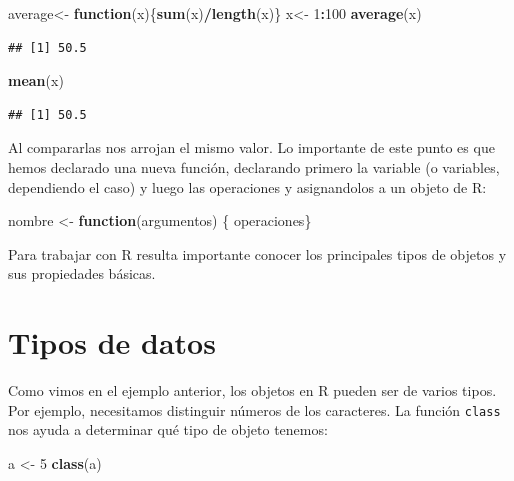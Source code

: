 \documentclass[
]{book}
\newenvironment{Shaded}{\begin{snugshade}}{\end{snugshade}}
\newcommand{\ControlFlowTok}[1]{\textcolor[rgb]{0.13,0.29,0.53}{\textbf{#1}}}
\newcommand{\DecValTok}[1]{\textcolor[rgb]{0.00,0.00,0.81}{#1}}
\newcommand{\FunctionTok}[1]{\textcolor[rgb]{0.13,0.29,0.53}{\textbf{#1}}}
\newcommand{\NormalTok}[1]{#1}
\newcommand{\OtherTok}[1]{\textcolor[rgb]{0.56,0.35,0.01}{#1}}
\newcommand{\SpecialCharTok}[1]{\textcolor[rgb]{0.81,0.36,0.00}{\textbf{#1}}}
\begin{document}
\begin{Shaded}
\begin{Highlighting}[]
\NormalTok{average}\OtherTok{\textless{}{-}} \ControlFlowTok{function}\NormalTok{(x)\{}\FunctionTok{sum}\NormalTok{(x)}\SpecialCharTok{/}\FunctionTok{length}\NormalTok{(x)\}}
\NormalTok{x}\OtherTok{\textless{}{-}} \DecValTok{1}\SpecialCharTok{:}\DecValTok{100}
\FunctionTok{average}\NormalTok{(x)}
\end{Highlighting}
\end{Shaded}

\begin{verbatim}
## [1] 50.5
\end{verbatim}

\begin{Shaded}
\begin{Highlighting}[]
\FunctionTok{mean}\NormalTok{(x)}
\end{Highlighting}
\end{Shaded}

\begin{verbatim}
## [1] 50.5
\end{verbatim}

Al compararlas nos arrojan el mismo valor.
Lo importante de este punto es que hemos declarado una nueva función, declarando primero la variable (o variables, dependiendo el caso) y luego las operaciones y asignandolos a un objeto de R:

\begin{Shaded}
\begin{Highlighting}[]
\NormalTok{nombre }\OtherTok{\textless{}{-}} \ControlFlowTok{function}\NormalTok{(argumentos) \{}
\NormalTok{  operaciones\}}
\end{Highlighting}
\end{Shaded}

Para trabajar con R resulta importante conocer los principales tipos de objetos y sus propiedades básicas.

\section{Tipos de datos}\label{tipos-de-datos}

Como vimos en el ejemplo anterior, los objetos en R pueden ser de varios tipos.
Por ejemplo, necesitamos distinguir números de los caracteres.
La función \texttt{class} nos ayuda a determinar qué tipo de objeto tenemos:

\begin{Shaded}
\begin{Highlighting}[]
\NormalTok{a }\OtherTok{\textless{}{-}} \DecValTok{5}
\FunctionTok{class}\NormalTok{(a)}
\end{Highlighting}
\end{Shaded}
\end{document}
